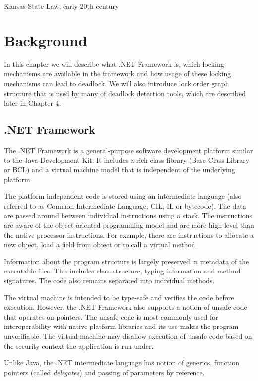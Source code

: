 %
         {Kansas State Law, early 20th century}
\chapter{Background}

In this chapter we will describe what .NET Framework is, which locking mechanisms are available in the framework and how usage of these locking mechanisms can lead to deadlock. We will also introduce lock order graph structure that is used by many of deadlock detection tools, which are described later in Chapter 4.

\section{.NET Framework}

The .NET Framework is a general-purpose software development platform similar to the Java Development Kit. It includes a rich class library (Base Class Library or BCL) and a virtual machine model that is independent of the underlying platform.

The platform independent code is stored using an intermediate language (also referred to as Common Intermediate Language, CIL, IL or bytecode). The data are passed around between individual instructions using a stack. The instructions are aware of the object-oriented programming model and are more high-level than the native processor instructions. For example, there are instructions to allocate a new object, load a field from object or to call a virtual method.

Information about the program structure is largely preserved in metadata of the executable files. This includes class structure, typing information and method signatures. The code also remains separated into individual methods.

The virtual machine is intended to be type-safe and verifies the code before execution. However, the .NET Framework also supports a notion of unsafe code that operates on pointers. The unsafe code is most commonly used for interoperability with native platform libraries and its use makes the program unverifiable. The virtual machine may disallow execution of unsafe code based on the security context the application is run under.

Unlike Java, the .NET intermediate language has notion of generics, function pointers (called \emph{delegates}) and passing of parameters by reference.

